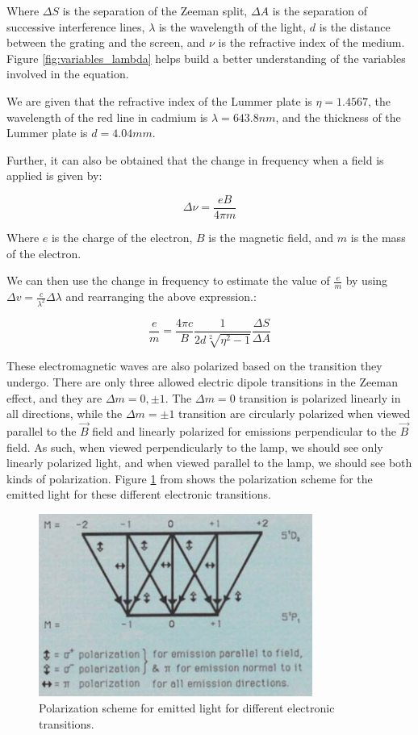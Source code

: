 Where $\Delta S$ is the separation of the Zeeman split, $\Delta A$ is the separation of successive interference lines, $\lambda$ is the wavelength of the light, $d$ is the distance between the grating and the screen, and $\nu$ is the refractive index of the medium.
Figure \ref{fig:variables_lambda} helps build a better understanding of the variables involved in the equation.

We are given that the refractive index of the Lummer plate is $\eta = 1.4567$, the wavelength of the red line in cadmium is $\lambda = 643.8 nm$, and the thickness of the Lummer plate is $d = 4.04 mm$.

Further, it can also be obtained that the change in frequency when a field is applied is given by:

\begin{equation}
    \Delta \nu = \frac{e B}{4\pi m}
\end{equation}

Where $e$ is the charge of the electron, $B$ is the magnetic field, and $m$ is the mass of the electron.

We can then use the change in frequency to estimate the value of $\frac{e}{m}$ by using $\Delta v = \frac{c}{\lambda^2} \Delta \lambda$ and rearranging the above expression.:

\begin{equation} \label{eq:em_relationship}
    \frac{e}{m} =
    \frac{4 \pi c}{B} \frac{1}{2d\sqrt[2]{\eta^2 - 1}} \frac{\Delta S}{\Delta A}
\end{equation}

These electromagnetic waves are also polarized based on the transition they undergo. There are only three allowed electric dipole transitions in the Zeeman effect, and they are $\Delta m = 0, \pm1$. The $\Delta m = 0$ transition is polarized linearly in all directions, while the $\Delta m = \pm1$ transition are circularly polarized when viewed parallel to the $\vec{B}$ field and linearly polarized for emissions perpendicular to the $\vec{B}$ field. As such, when viewed perpendicularly to the lamp, we should see only linearly polarized light, and when viewed parallel to the lamp, we should see both kinds of polarization. Figure \ref{fig:polarization_scheme} from \cite{ZeemanEffectLab} shows the polarization scheme for the emitted light for these different electronic transitions.

\begin{figure}
    \centering
    \includegraphics[width=0.8\textwidth]{intro/polarization_scheme.png}
    \caption{Polarization scheme for emitted light for different electronic transitions.}
    \label{fig:polarization_scheme}
\end{figure}
